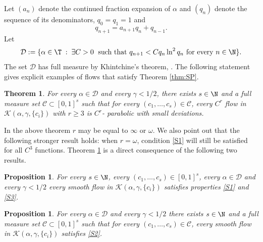 \documentclass[JEP,XML,SOM,Unicode,NoFloatCountersInSection]{cedram}
\newcommand\cC{\mathcal{C}}
\newcommand\cD{\mathcal{D}}
\theoremstyle{definition}
\theoremstyle{plain}
\newtheorem{Main}{Theorem}
\newtheorem{proposition}[definition]{Proposition}
\begin{document}
Let $(a_n)$ denote the continued fraction expansion of $\alpha$ and $(q_n)$ denote the sequence of its denominators, \ie $q_0=q_1=1$ and
\begin{equation*}%
q_{n+1}=a_{n+1}q_n+q_{n-1}.
\end{equation*}
Let
\begin{equation}\label{eq:cp}
\cD:=\{\alpha\in \T\;:\;\exists C>0 \; \text{ such that }q_{n+1}<Cq_n \ln^2 q_n \text{ for every }n\in \N\}.
\end{equation}
The set $\cD$ has full measure by Khintchine's theorem, \cite[\S 13]{Khi}. The following statement
gives explicit examples of flows that satisfy Theorem \ref{thm:SP}.
\begin{Main}\label{prop:sch} For every $\alpha\in \cD$ and every $\gamma<1/2$, there exists $s\in \N$ and a full measure set $\cC\subset [0,1]^s$ such that for every $(c_1,\ldots, c_s)\in \cC$, every $C^r$ flow in $\mathcal{K}(\alpha,\gamma, \{c_i\})$
with $r\geq 3$ is $C^r$- parabolic with small deviations.
\end{Main}
In the above theorem $r$ may be equal to $\infty$ or $\omega$. We also point out that the following stronger result holds: when $r=\omega$, condition \eqref{S1} will still be satisfied for all $C^3$ functions.
Theorem \ref{prop:sch} is a direct consequence of the following two results.

\begin{proposition}\label{lem:sch2} For every $s\in \N$, every $(c_1,\ldots, c_s)\in [0,1]^s$, every $\alpha\in \cD$ and every $\gamma<1/2$ every smooth flow in $\mathcal{K}(\alpha,\gamma, \{c_i\})$ satisfies properties \eqref{S1} and \eqref{S3}.
\end{proposition}

\begin{proposition}\label{prop:sch2}
For every $\alpha\in \cD$ and every $\gamma<1/2$ there exists $s\in \N$ and a full measure set $\cC\subset [0,1]^s$ such that for every $(c_1,\ldots, c_s)\in \cC$, every smooth flow in $\mathcal{K}(\alpha,\gamma, \{c_i\})$ satisfies \eqref{S2}.
\end{proposition}
\end{document}
